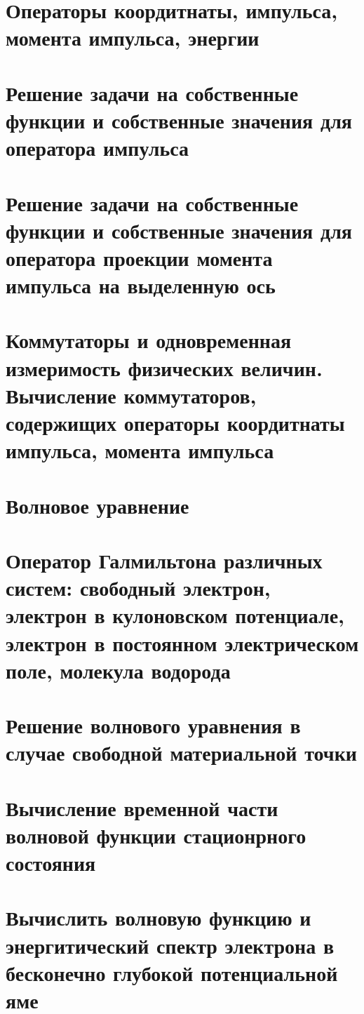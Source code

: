 \documentclass[12pt,a4paper]{article}
\begin{document}
\section[short]{Операторы коордитнаты, импульса, момента импульса, энергии}

\section[short]{Решение задачи на собственные функции и собственные значения для 
оператора импульса}

\section[short]{Решение задачи на собственные функции и собственные значения 
для оператора проекции момента импульса на выделенную ось}

\section[short]{Коммутаторы и одновременная измеримость физических величин. 
Вычисление коммутаторов, содержищих операторы коордитнаты импульса, момента импульса}

\section[short]{Волновое уравнение}

\section[short]{Оператор Галмильтона различных систем: свободный электрон, электрон в 
кулоновском потенциале, электрон в постоянном электрическом поле, молекула водорода}

\section[short]{Решение волнового уравнения в случае свободной материальной точки}

\section[short]{Вычисление временной части волновой функции стационрного состояния}

\section[short]{Вычислить волновую функцию и энергитический спектр электрона в бесконечно 
глубокой потенциальной яме}
\end{document}
